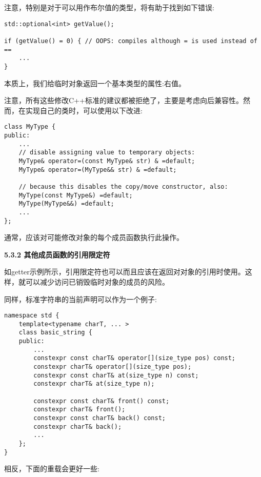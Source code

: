 注意，特别是对于可以用作布尔值的类型，将有助于找到如下错误:\par

\begin{lstlisting}[caption={}]
std::optional<int> getValue();

if (getValue() = 0) { // OOPS: compiles although = is used instead of ==
	...
}
\end{lstlisting}

本质上，我们给临时对象返回一个基本类型的属性:右值。\par

注意，所有这些修改C++标准的建议都被拒绝了，主要是考虑向后兼容性。然而，在实现自己的类时，可以使用以下改进:\par

\begin{lstlisting}[caption={}]
class MyType {
public:
	...
	// disable assigning value to temporary objects:
	MyType& operator=(const MyType& str) & =default;
	MyType& operator=(MyType&& str) & =default;
	
	// because this disables the copy/move constructor, also:
	MyType(const MyType&) =default;
	MyType(MyType&&) =default;
	...
};
\end{lstlisting}

通常，应该对可能修改对象的每个成员函数执行此操作。\par

\hspace*{\fill} \par %
\textbf{5.3.2 其他成员函数的引用限定符}

如getter示例所示，引用限定符也可以而且应该在返回对对象的引用时使用。这样，就可以减少访问已销毁临时对象的成员的风险。\par

同样，标准字符串的当前声明可以作为一个例子:\par

\begin{lstlisting}[caption={}]
namespace std {
	template<typename charT, ... >
	class basic_string {
	public:
		...
		constexpr const charT& operator[](size_type pos) const;
		constexpr charT& operator[](size_type pos);
		constexpr const charT& at(size_type n) const;
		constexpr charT& at(size_type n);
		
		constexpr const charT& front() const;
		constexpr charT& front();
		constexpr const charT& back() const;
		constexpr charT& back();
		...
	};
}
\end{lstlisting}

相反，下面的重载会更好一些:\par

